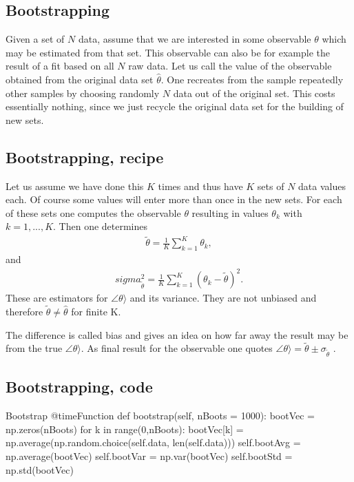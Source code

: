 \documentclass[letterpaper,10pt,english]{sphinxmanual}
\begin{document}
\subsection{Bootstrapping}
\label{\detokenize{chapter2:bootstrapping}}
Given a set of \(N\) data, assume that we are interested in some
observable \(\theta\) which may be estimated from that set. This observable can also be for example the result of a fit based on all \(N\) raw data.
Let us call the value of the observable obtained from the original
data set \(\hat{\theta}\). One recreates from the sample repeatedly
other samples by choosing randomly \(N\) data out of the original set.
This costs essentially nothing, since we just recycle the original data set for the building of new sets.


\subsection{Bootstrapping, recipe}
\label{\detokenize{chapter2:bootstrapping-recipe}}
Let us assume we have done this \(K\) times and thus have \(K\) sets of \(N\)
data values each.
Of course some values will enter more than once in the new sets. For each of these sets one computes the observable \(\theta\) resulting in values \(\theta_k\) with \(k = 1,...,K\). Then one determines
\begin{equation*}
\begin{split}
\tilde{\theta} = \frac{1}{K} \sum_{k=1}^K \theta_k,
\end{split}
\end{equation*}
and
\begin{equation*}
\begin{split}
sigma^2_{\tilde{\theta}} = \frac{1}{K} \sum_{k=1}^K \left(\theta_k-\tilde{\theta}\right)^2.
\end{split}
\end{equation*}
These are estimators for \(\angle\theta\rangle\) and its variance. They are not unbiased and therefore
\(\tilde{\theta}\neq\hat{\theta}\)  for finite K.

The difference is called bias and gives an idea on how far away the result may be from
the true \(\angle\theta\rangle\). As final result for the observable one quotes \(\angle\theta\rangle = \tilde{\theta} \pm \sigma_{\tilde{\theta}}\) .


\subsection{Bootstrapping, code}
\label{\detokenize{chapter2:bootstrapping-code}}
\begin{sphinxVerbatim}[commandchars=\\\{\}]
    \PYGZsh{} Bootstrap
        @timeFunction
        def bootstrap(self, nBoots = 1000):
            bootVec = np.zeros(nBoots)
            for k in range(0,nBoots):
                bootVec[k] = np.average(np.random.choice(self.data, len(self.data)))
            self.bootAvg = np.average(bootVec)
            self.bootVar = np.var(bootVec)
            self.bootStd = np.std(bootVec)
\end{sphinxVerbatim}
\end{document}
